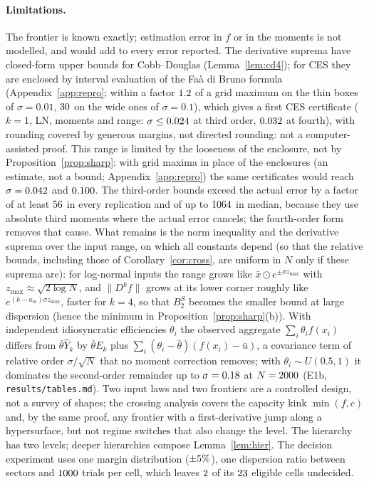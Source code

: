 \documentclass[10pt,a4paper]{article}
\theoremstyle{plain}
\theoremstyle{definition}
\theoremstyle{remark}
\newcommand{\Yh}{\widehat{Y}}
\begin{document}
\paragraph{Limitations.} The frontier is known exactly; estimation error in $f$ or in the moments is not modelled, and would add to every error reported. The derivative suprema have closed-form upper bounds for Cobb--Douglas (Lemma~\ref{lem:cd4}); for CES they are enclosed by interval evaluation of the Fa\`a di Bruno formula (Appendix~\ref{app:repro}; within a factor $1.2$ of a grid maximum on the thin boxes of $\sigma=0.01$, $30$ on the wide ones of $\sigma=0.1$), which gives a first CES certificate ($k=1$, LN, moments and range: $\sigma\le0.024$ at third order, $0.032$ at fourth), with rounding covered by generous margins, not directed rounding: not a computer-assisted proof. This range is limited by the looseness of the enclosure, not by Proposition~\ref{prop:sharp}: with grid maxima in place of the enclosures (an estimate, not a bound; Appendix~\ref{app:repro}) the same certificates would reach $\sigma=0.042$ and $0.100$. The third-order bounds exceed the actual error by a factor of at least $56$ in every replication and of up to $1064$ in median, because they use absolute third moments where the actual error cancels; the fourth-order form removes that cause. What remains is the norm inequality and the derivative suprema over the input range, on which all constants depend (so that the relative bounds, including those of Corollary~\ref{cor:cross}, are uniform in $N$ only if these suprema are): for log-normal inputs the range grows like $\bar x\odot e^{\pm\sigma z_{\max}}$ with $z_{\max}\approx\sqrt{2\log N}$, and $\|D^k\!f\|$ grows at its lower corner roughly like $e^{(k-a_m)\sigma z_{\max}}$, faster for $k=4$, so that $B_2^S$ becomes the smaller bound at large dispersion (hence the minimum in Proposition~\ref{prop:sharp}(b)). With independent idiosyncratic efficiencies $\theta_i$ \citep{farrell1957} the observed aggregate $\sum_i\theta_if(x_i)$ differs from $\bar\theta\Yh_k$ by $\bar\theta E_k$ plus $\sum_i(\theta_i-\bar\theta)(f(x_i)-\bar u)$, a covariance term of relative order $\sigma/\sqrt N$ that no moment correction removes; with $\theta_i\sim U(0.5,1)$ it dominates the second-order remainder up to $\sigma=0.18$ at $N=2000$ (E1b, \texttt{results/tables.md}). Two input laws and two frontiers are a controlled design, not a survey of shapes; the crossing analysis covers the capacity kink $\min(f,c)$ and, by the same proof, any frontier with a first-derivative jump along a hypersurface, but not regime switches that also change the level. The hierarchy has two levels; deeper hierarchies compose Lemma~\ref{lem:hier}. The decision experiment uses one margin distribution ($\pm5\%$), one dispersion ratio between sectors and $1000$ trials per cell, which leaves $2$ of its $23$ eligible cells undecided.
\end{document}
